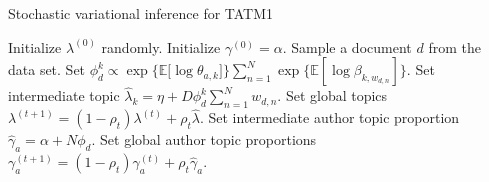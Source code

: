 \begin{algorithm}[tb]
\caption{Stochastic variational inference for TATM1}
\label{alg:stoch_tatm1}
\begin{algorithmic}[1]
	\STATE Initialize $\lambda^{(0)}$ randomly.
	\STATE Initialize $\gamma^{(0)} = \alpha$.
	\REPEAT
		\STATE Sample a document $d$ from the data set.
			\STATE Set $\displaystyle \phi^k_{d} \propto \exp{ \{ \mathbb{E}[\log \theta_{a,k}} ]\} \sum_{n=1}^{N}  \exp \{ \mathbb{E}[\log \beta_{k,w_{d,n}}] \}$.
		\ENDFOR
		\STATE Set intermediate topic $\hat{\lambda}_k = \eta +D \phi_d^k \sum_{n=1}^{N}{w_{d,n}}$.
		\STATE Set global topics $\lambda^{(t+1)} = (1 - \rho_t) \lambda^{(t)} + \rho_t \hat{\lambda}$.
		\STATE Set intermediate author topic proportion $\hat{\gamma}_a = \alpha +  N \phi_d$.
		\STATE Set global author topic proportions $\gamma_a^{(t+1)} = (1 - \rho_t) \gamma_a^{(t)} + \rho_t \hat{\gamma}_a$.
\end{algorithmic}
\end{algorithm}